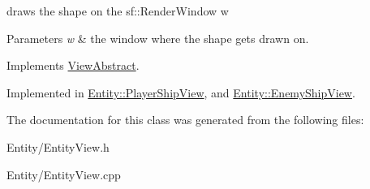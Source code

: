 draws the shape on the sf\+::\+Render\+Window w 


\begin{DoxyParams}{Parameters}
{\em w} & the window where the shape gets drawn on. \\
\hline
\end{DoxyParams}


Implements \hyperlink{classViewAbstract_ab9d21012b19948e704a800da39b232ba}{View\+Abstract}.



Implemented in \hyperlink{classEntity_1_1PlayerShipView_ad9767510af4af87a4b67182065a1bf6c}{Entity\+::\+Player\+Ship\+View}, and \hyperlink{classEntity_1_1EnemyShipView_a3417632d012f12720ebbbe4b525b3c19}{Entity\+::\+Enemy\+Ship\+View}.



The documentation for this class was generated from the following files\+:\begin{DoxyCompactItemize}
\item 
Entity/Entity\+View.\+h\item 
Entity/Entity\+View.\+cpp\end{DoxyCompactItemize}
